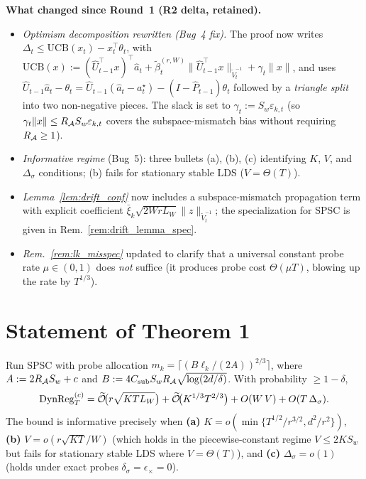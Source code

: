 \textbf{What changed since Round~1 (R2 delta, retained).}
\begin{itemize}[leftmargin=*,itemsep=1pt,topsep=1pt]
\item \emph{Optimism decomposition rewritten (Bug~4 fix).} The proof
now writes $\Delta_t\le\mathrm{UCB}(x_t)-x_t^\top\theta_t$, with
$\mathrm{UCB}(x):=(\widehat U_{t-1}^\top x)^\top\widehat a_t
+\widetilde\beta_t^{(r,W)}\|\widehat U_{t-1}^\top x\|_{\widetilde V_t^{-1}}+\gamma_t\|x\|$,
and uses $\widehat U_{t-1}\widehat a_t-\theta_t
= \widehat U_{t-1}(\widehat a_t-a_t^\star)-(I-\widehat P_{t-1})\theta_t$
followed by a \emph{triangle split} into two non-negative pieces.
The slack is set to $\gamma_t := S_w\varepsilon_{k,t}$ (so
$\gamma_t\|x\|\le R_{\mathcal{A}} S_w\varepsilon_{k,t}$ covers the subspace-mismatch
bias without requiring $R_{\mathcal{A}}\ge 1$).
\item \emph{Informative regime} (Bug~5): three bullets (a), (b), (c)
identifying $K$, $V$, and $\Delta_\sigma$ conditions; (b) fails for
stationary stable LDS ($V=\Theta(T)$).
\item \emph{Lemma~\ref{lem:drift_conf}} now includes a
subspace-mismatch propagation term with explicit coefficient
$\bar\xi_k\sqrt{2WrL_W}\|z\|_{\widetilde V_t^{-1}}$; the
specialization for SPSC is given in Rem.~\ref{rem:drift_lemma_spec}.
\item \emph{Rem.~\ref{rem:lk_misspec}} updated to clarify that a
universal constant probe rate $\mu\in(0,1)$ does \emph{not} suffice
(it produces probe cost $\Theta(\mu T)$, blowing up the rate by $T^{1/3}$).
\end{itemize}

\section*{Statement of Theorem 1}

\begin{theorem}
\label{thm:spsc_regret}
Run SPSC with probe allocation $m_k = \lceil (B\ell_k/(2A))^{2/3}\rceil$,
where $A := 2R_{\mathcal{A}} S_w + c$ and
$B := 4 C_{\mathrm{sub}} S_w R_{\mathcal{A}} \sqrt{\log(2d/\delta)}$.
With probability $\ge 1-\delta$,
\begin{equation}
\mathrm{DynReg}_T^{(c)}
= \widetilde{\mathcal{O}}\!\bigl(r\sqrt{K T L_W}\bigr)
+ \widetilde{\mathcal{O}}\!\bigl(K^{1/3}T^{2/3}\bigr)
+ O(W\,V)
+ O(T\,\Delta_\sigma).
\label{eq:main_bound}
\end{equation}
The bound is informative precisely when
\textbf{(a)} $K=o(\min\{T^{1/2}/r^{3/2},d^2/r^2\})$,
\textbf{(b)} $V=o(r\sqrt{KT}/W)$ (which holds in the piecewise-constant
regime $V\le 2KS_w$ but fails for stationary stable LDS where $V=\Theta(T)$),
and \textbf{(c)} $\Delta_\sigma = o(1)$ (holds under exact probes
$\delta_\sigma=\epsilon_\times=0$).
\end{theorem}


